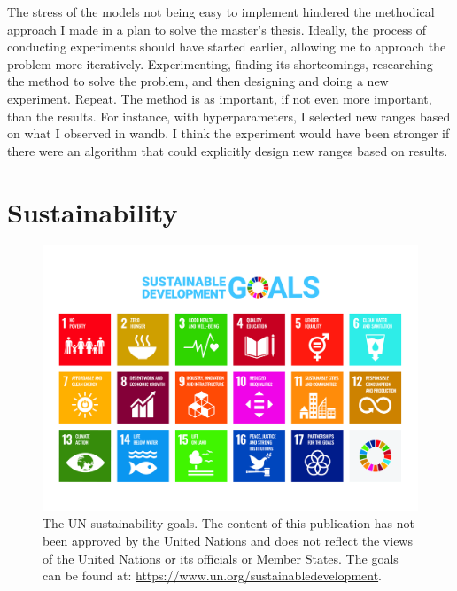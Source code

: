 

The stress of the models not being easy to implement hindered the methodical approach I made in a plan to solve the master's thesis. Ideally, the process of conducting experiments should have started earlier, allowing me to approach the problem more iteratively. Experimenting, finding its shortcomings, researching the method to solve the problem, and then designing and doing a new experiment. Repeat. The method is as important, if not even more important, than the results. For instance, with hyperparameters, I selected new ranges based on what I observed in \acrfull{wandb}. I think the experiment would have been stronger if there were an algorithm that could explicitly design new ranges based on results.

\section{Sustainability}

\begin{figure}
    \centering
    \includegraphics[width=1\linewidth]{figures/un_poster.jpg}
    \caption{The UN sustainability goals. The content of this publication has not been approved by the United Nations and does not reflect the views of the United Nations or its officials or Member States. The goals can be found at: \url{https://www.un.org/sustainabledevelopment}.}
    \label{fig:sdg}
\end{figure}



